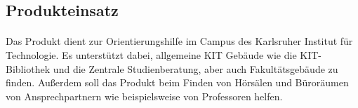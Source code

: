 \newpage
\subsection{Produkteinsatz}

\paragraph*{}
Das Produkt dient zur Orientierungshilfe im Campus des Karlsruher Institut für Technologie.
Es unterstützt dabei, allgemeine KIT Gebäude wie die KIT-Bibliothek und die Zentrale Studienberatung, aber auch Fakultätsgebäude zu finden. Außerdem soll das Produkt beim Finden von Hörsälen und Büroräumen von Ansprechpartnern wie beispielsweise von Professoren helfen.



